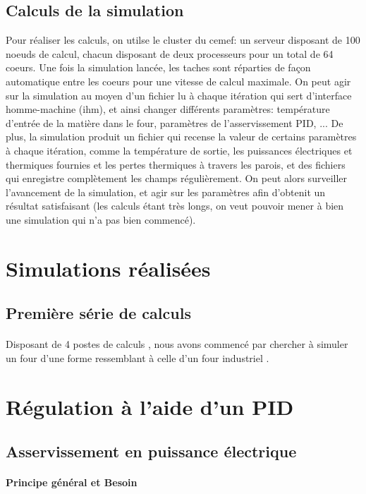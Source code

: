 \documentclass[12pt, a4paper, french, BCOR = 0pt, DIV = 10]{scrartcl}
\begin{document}
    \subsection{Calculs de la simulation}
    Pour réaliser les calculs, on utilse le cluster du cemef: un serveur disposant de 100 noeuds de calcul, chacun disposant de deux processeurs pour un total de 64 coeurs. Une fois la simulation lancée, les taches sont réparties de façon automatique entre les coeurs pour une vitesse de calcul maximale. On peut agir sur la simulation au moyen d'un fichier lu à chaque itération qui sert d'interface homme-machine (ihm), et ainsi changer différents paramètres: température d'entrée de la matière dans le four, paramètres de l'asservissement PID, ... De plus, la simulation produit un fichier qui recense la valeur de certains paramètres à chaque itération, comme la température de sortie, les puissances électriques et thermiques fournies et les pertes thermiques à travers les parois, et des fichiers qui enregistre complètement les champs régulièrement. On peut alors surveiller l'avancement de la simulation, et agir sur les paramètres afin d'obtenit un résultat satisfaisant (les calculs étant très longs, on veut pouvoir mener à bien une simulation qui n'a pas bien commencé).

    
    \section{Simulations réalisées}
    
	
	\subsection{Première série de calculs}
	\paragraph{}
	Disposant de 4 postes de calculs , nous avons commencé par chercher à simuler un four  d'une forme ressemblant à celle d'un four industriel .


    \section{Régulation à l'aide d'un PID}
    \subsection{Asservissement en puissance électrique}
    \paragraph{Principe général et Besoin}
\end{document}
